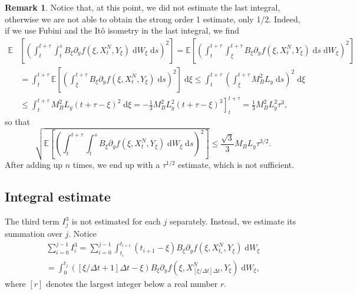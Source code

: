 \documentclass[reqno,12pt]{amsart}
\theoremstyle{plain}%
\theoremstyle{definition}
\newtheorem{rmk}{Remark}[section]
\begin{document}
\begin{rmk}\tiny
Notice that, at this point, we did not estimate the last integral, otherwise we are not able to obtain the strong order 1 estimate, only 1/2. Indeed, if we use Fubini and the It\^o isometry in the last integral, we find
\begin{align*}
  \mathbb{E} & \left[ \left( \int_t^{t + \tau} \int_t^s B_\xi \partial_y f(\xi, X_t^N, Y_\xi)\;\mathrm{d}W_\xi\;\mathrm{d}s \right)^2\right] = \mathbb{E} \left[ \left( \int_t^{t + \tau} \int_\xi^{t+\tau} B_\xi \partial_y f(\xi, X_t^N, Y_\xi) \;\mathrm{d}s\;\mathrm{d}W_\xi \right)^2\right] \\
  & = \int_t^{t + \tau} \mathbb{E} \left[ \left( \int_\xi^{t+\tau} B_\xi \partial_y f(\xi, X_t^N, Y_\xi) \;\mathrm{d}s \right)^2\right] \;\mathrm{d}\xi  \leq  \int_t^{t + \tau}  \left( \int_\xi^{t+\tau} M_B^2 L_y \;\mathrm{d}s \right)^2\;\mathrm{d}\xi \\
  & \leq  \int_t^{t + \tau}  M_B^2 L_y (t + \tau - \xi)^2\;\mathrm{d}\xi  = \left. - \frac{1}{3} M_B^2 L_y^2 (t + \tau - \xi)^3 \right]_t^{t+\tau}  = \frac{1}{3} M_B^2 L_y^2 \tau^3,
\end{align*}
so that
\begin{equation}
\sqrt{\mathbb{E} \left[ \left( \int_t^{t + \tau} \int_t^s B_\xi \partial_y f(\xi, X_t^N, Y_\xi)\;\mathrm{d}W_\xi\;\mathrm{d}s \right)^2\right]} \leq \frac{\sqrt{3}}{3} M_B L_y \tau^{3/2}.
\end{equation}
After adding up $n$ times, we end up with a $\tau^{1/2}$ estimate, which is not sufficient.
\end{rmk}

\subsection{Integral estimate}

The third term $I_j^3$ is not estimated for each $j$ separately. Instead, we estimate its summation over $j$. Notice
\begin{multline*}
\sum_{i=0}^{j-1} I_i^3 = \sum_{i=0}^{j-1} \int_{t_i}^{t_{i+1}} (t_{i+1} - \xi) B_\xi \partial_y f(\xi, X_{t_i}^N, Y_\xi)  \;\mathrm{d}W_\xi \\
 = \int_0^{t_j} \left([\xi/\Delta t + 1]\Delta t - \xi\right) B_\xi \partial_y f(\xi, X_{[\xi/\Delta t]\Delta t}^N, Y_\xi) \;\mathrm{d}W_\xi,
\end{multline*}
where $[r]$ denotes the largest integer below a real number $r$.
\end{document}
